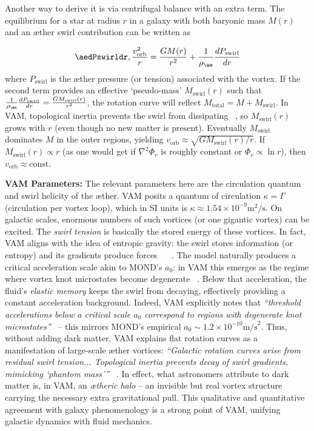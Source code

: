 \documentclass[a4paper, aps,preprint,superscriptaddress, 12pt]{revtex4}
\begin{document}
Another way to derive it is via centrifugal balance with an extra term. The equilibrium for a star at radius $r$ in a galaxy with both baryonic mass $M(r)$ and an æther swirl contribution can be written as

\begin{equation}\aedPswirldr,\frac{v_{\text{orb}}^2}{r} = \frac{GM(r)}{r^2} + \frac{1}{\rho_{\ae}}\frac{dP_{\text{swirl}}}{dr}
\end{equation}
where $P_{\text{swirl}}$ is the æther pressure (or tension) associated with the vortex. If the second term provides an effective `pseudo-mass’ $M_{\text{swirl}}(r)$ such that $\frac{1}{\rho_{\ae}}\frac{dP_{\text{swirl}}}{dr} = \frac{G M_{\text{swirl}}(r)}{r^2}$, the rotation curve will reflect $M_{\text{total}} = M + M_{\text{swirl}}$. In VAM, topological inertia prevents the swirl from dissipating~\cite{Iskandarani2025c} , so $M_{\text{swirl}}(r)$ grows with $r$ (even though no new matter is present). Eventually $M_{\text{swirl}}$ dominates $M$ in the outer regions, yielding $v_{\text{orb}} \approx \sqrt{G M_{\text{swirl}}(r)/r}$. If $M_{\text{swirl}}(r)\propto r$ (as one would get if $\nabla^2\Phi_v$ is roughly constant or $\Phi_v \propto \ln r$), then $v_{\text{orb}}\approx \text{const}$.


\textbf{VAM Parameters:} The relevant parameters here are the circulation quantum and swirl helicity of the æther. VAM posits a quantum of circulation $\kappa = \Gamma$ (circulation per vortex loop), which in SI units is $\kappa \approx 1.54\times10^{-9}\text{m}^2/\text{s}$. On galactic scales, enormous numbers of such vortices (or one gigantic vortex) can be excited. The \textit{swirl tension} is basically the stored energy of these vortices. In fact, VAM aligns with the idea of entropic gravity: the swirl stores information (or entropy) and its gradients produce forces~\cite{Iskandarani2025c} ~\cite{Iskandarani2025c} . The model naturally produces a critical acceleration scale akin to MOND’s $a_0$: in VAM this emerges as the regime where vortex knot microstates become degenerate~\cite{Iskandarani2025c} . Below that acceleration, the fluid’s \textit{elastic memory} keeps the swirl from decaying, effectively providing a constant acceleration background. Indeed, VAM explicitly notes that \textit{“threshold accelerations below a critical scale $a_0$ correspond to regions with degenerate knot microstates”}~\cite{Iskandarani2025c}  – this mirrors MOND’s empirical $a_0 \sim 1.2\times10^{-10}\text{m/s}^2$. Thus, without adding dark matter, VAM explains flat rotation curves as a manifestation of large-scale æther vortices: \textit{“Galactic rotation curves arise from residual swirl tension... Topological inertia prevents decay of swirl gradients, mimicking ‘phantom mass’”}~\cite{Iskandarani2025c} . In effect, what astronomers attribute to dark matter is, in VAM, an \textit{ætheric halo} – an invisible but real vortex structure carrying the necessary extra gravitational pull. This qualitative and quantitative agreement with galaxy phenomenology is a strong point of VAM, unifying galactic dynamics with fluid mechanics.
\end{document}
